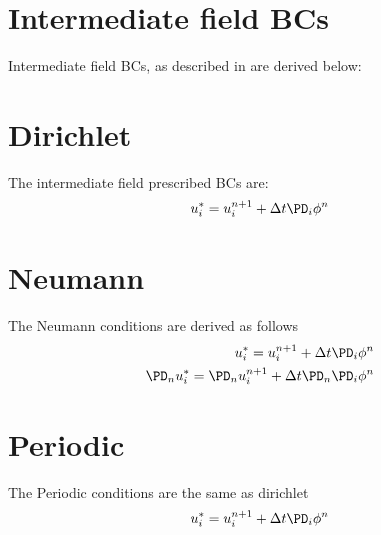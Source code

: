 \documentclass[landscape]{article}
\begin{document}
\doublespacing
\MOONSTITLE
\maketitle

\section{Intermediate field BCs}
Intermediate field BCs, as described in \cite{Kim1984} are derived below:

\section{Dirichlet}
The intermediate field prescribed BCs are:
\begin{equation}\begin{aligned}
  u_i^* = u_i^{n+1} + \Delta t \PD_i \phi^n \\
\end{aligned}\end{equation}
\section{Neumann}
The Neumann conditions are derived as follows
\begin{equation}\begin{aligned}
  u_i^* = u_i^{n+1} + \Delta t \PD_i \phi^n \\
  \PD_n u_i^* = \PD_n u_i^{n+1} + \Delta t \PD_n \PD_i \phi^n \\
\end{aligned}\end{equation}
\section{Periodic}
The Periodic conditions are the same as dirichlet
\begin{equation}\begin{aligned}
  u_i^* = u_i^{n+1} + \Delta t \PD_i \phi^n \\
\end{aligned}\end{equation}
\end{document}
